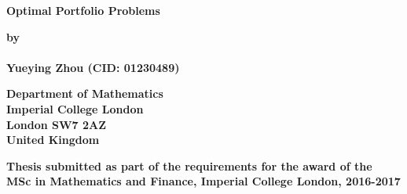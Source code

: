 \thispagestyle{empty}
\null\vskip0.2in%
\begin{center}
\LARGE{{\bf 
Optimal Portfolio Problems}}
\end{center}

\vspace{0.5cm}

\begin{center}
{\Large {\bf by}}\\
\mbox{} \\
{\Large {\bf Yueying Zhou (CID: 01230489)}}
\end{center}

\vspace{1cm}

\begin{center}
\large{\bf{Department of Mathematics \\ Imperial College London \\
London SW7 2AZ \\ United Kingdom}}
\end{center}



\vspace{9.5cm}

\begin{center}
\large{\bf{Thesis submitted as part of the requirements for the award of the \\
MSc in Mathematics and Finance, Imperial College London, 2016-2017}}
\end{center}

\vspace{2cm}

